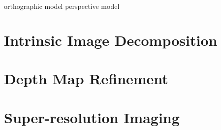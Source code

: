 orthographic model
perspective model


\section{Intrinsic Image Decomposition}

\section{Depth Map Refinement}
\section{Super-resolution Imaging}

%
%
